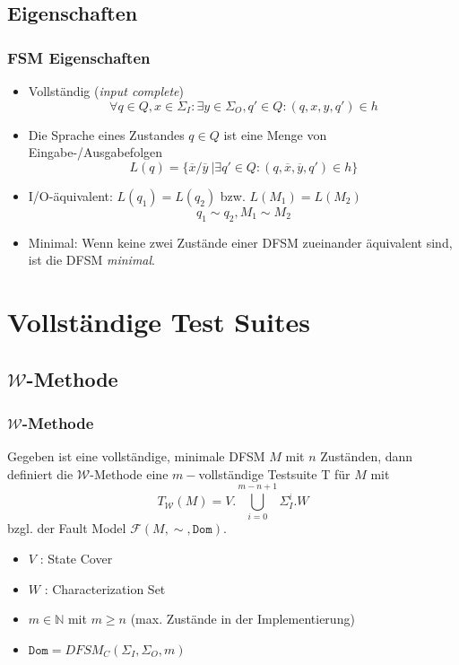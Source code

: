 \documentclass[10pt]{beamer}
\newcommand{\W}{\mathcal{W}}
\newcommand{\F}{\mathcal{F}}
\begin{document}
\subsection{Eigenschaften}
\begin{frame}
\frametitle{FSM Eigenschaften}
\begin{itemize}
  \item<1-> Vollständig (\emph{input complete})$$\forall q\in Q, x\in \Sigma_I : \exists y \in \Sigma_O, q'\in Q : (q,x,y,q')\in h$$
  \item<2-> Die Sprache eines Zustandes $q \in Q$ ist eine Menge von Eingabe-/Aus\-gabefolgen $$L(q)= \{\overline{x}/\overline{y}\ | \exists q' \in Q : (q,\overline{x}, \overline{y}, q') \in h \}$$
  \item<3-> I/O-äquivalent: $L(q_1) = L(q_2)$ bzw. $L(M_1) = L(M_2)$ $$q_1 \sim q_2, M_1 \sim M_2$$
  \item<4-> Minimal: Wenn keine zwei Zustände einer DFSM zueinander äquivalent sind, ist die DFSM \emph{minimal}.
\end{itemize}
\end{frame}
\section{Vollständige Test Suites}
\subsection{$\W$-Methode}
\begin{frame}
  \frametitle{$\W$-Methode}
  \begin{definition}[$\W$-Methode]
  Gegeben ist eine vollständige, minimale DFSM $M$ mit $n$ Zuständen, dann definiert die $\W$-Methode eine $m-$vollständige Testsuite T für $M$ mit
  $$T_\W(M) = V.\bigcup\limits_{i=0}^{m-n+1}\Sigma_I^i.W$$
  bzgl. der Fault Model $\F(M, \sim, \texttt{Dom})$.
  \end{definition}
  \pause
  \begin{itemize}
    \item<2-> $V$ : State Cover
    \item<3-> $W$ : Characterization Set
    \item<4-> $m \in \mathbb{N}$ mit $m \geq n$ (max. Zustände in der Implementierung)
    \item<5-> $\texttt{Dom} = DFSM_C(\Sigma_I, \Sigma_O, m)$ 
  \end{itemize}

\end{frame}
\end{document}
